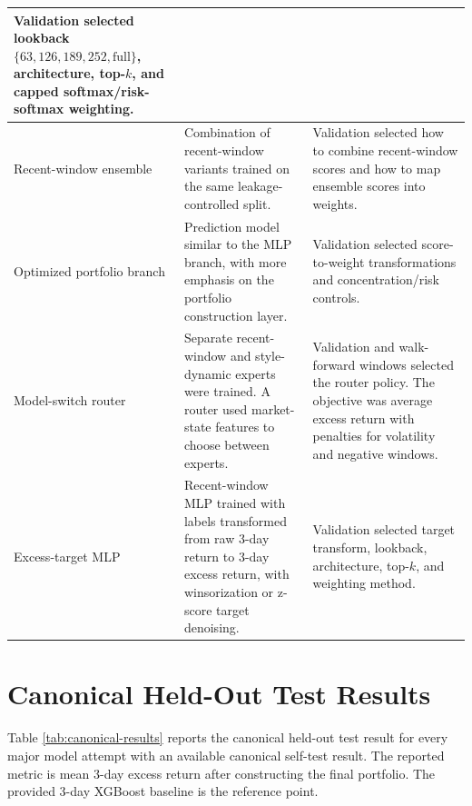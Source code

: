 \documentclass[11pt]{article}
\begin{document}
{\begin{longtable}{p{}p{}p{}}
Validation selected lookback \(\{63,126,189,252,\text{full}\}\), architecture,
top-\(k\), and capped softmax/risk-softmax weighting. \\
\midrule
Recent-window ensemble &
Combination of recent-window variants trained on the same leakage-controlled
split. &
Validation selected how to combine recent-window scores and how to map ensemble
scores into weights. \\
\midrule
Optimized portfolio branch &
Prediction model similar to the MLP branch, with more emphasis on the portfolio
construction layer. &
Validation selected score-to-weight transformations and concentration/risk
controls. \\
\midrule
Model-switch router &
Separate recent-window and style-dynamic experts were trained. A router used
market-state features to choose between experts. &
Validation and walk-forward windows selected the router policy. The objective
was average excess return with penalties for volatility and negative windows. \\
\midrule
Excess-target MLP &
Recent-window MLP trained with labels transformed from raw 3-day return to
3-day excess return, with winsorization or z-score target denoising. &
Validation selected target transform, lookback, architecture, top-\(k\), and
weighting method. \\
\bottomrule
\end{longtable}
}

\section{Canonical Held-Out Test Results}

Table \ref{tab:canonical-results} reports the canonical held-out test result
for every major model attempt with an available canonical self-test result. The
reported metric is mean 3-day excess return after constructing the final
portfolio. The provided 3-day XGBoost baseline is the reference point.
\end{document}
